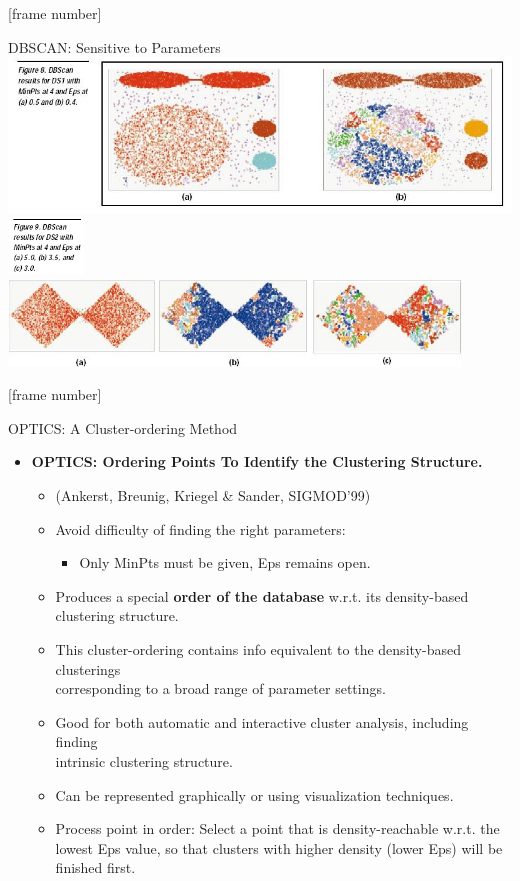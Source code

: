 \documentclass[aspectratio=169,t,xcolor=dvipsnames]{beamer}
\begin{document}
  {
    [frame number]
    \begin{frame}{DBSCAN: Sensitive to Parameters}
      \centering
      \includegraphics[width=14cm]{img/dbscan.png}\\
      \includegraphics[width=2cm]{img/dbscan3.png}
      \includegraphics[width=12cm]{img/dbscan2.png}
    \end{frame}
  }

  {
    [frame number]
    \begin{frame}{OPTICS: A Cluster-ordering Method}
      \begin{itemize}
        \item \textbf{OPTICS: Ordering Points To Identify the Clustering Structure.}
        \begin{itemize}
          \item (Ankerst, Breunig, Kriegel \& Sander, SIGMOD'99)
          \item Avoid difficulty of finding the right parameters:
          \begin{itemize}
            \item Only MinPts must be given, Eps remains open.
          \end{itemize}
          \item Produces a special \textbf{order of the database} w.r.t. its density-based clustering structure.
          \item This cluster-ordering contains info equivalent to the density-based clusterings \\ corresponding to a broad range of parameter settings.
          \item Good for both automatic and interactive cluster analysis, including finding \\
          intrinsic clustering structure.
          \item Can be represented graphically or using visualization techniques.
          \item Process point in order: Select a point that is density-reachable w.r.t. the lowest Eps value, so that clusters with higher density (lower Eps) will be finished first.
        \end{itemize}
      \end{itemize}
    \end{frame}
  }
\end{document}
